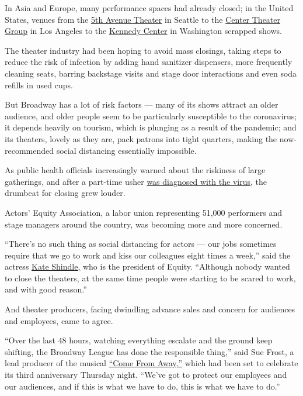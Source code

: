 In Asia and Europe, many performance spaces had already closed; in the
United States, venues from the \href{https://www.5thavenue.org/}{5th
Avenue Theater} in Seattle to the
\href{https://www.centertheatregroup.org/}{Center Theater Group} in Los
Angeles to the \href{https://www.kennedy-center.org/}{Kennedy Center} in
Washington scrapped shows.

The theater industry had been hoping to avoid mass closings, taking
steps to reduce the risk of infection by adding hand sanitizer
dispensers, more frequently cleaning seats, barring backstage visits and
stage door interactions and even soda refills in used cups.

But Broadway has a lot of risk factors --- many of its shows attract an
older audience, and older people seem to be particularly susceptible to
the coronavirus; it depends heavily on tourism, which is plunging as a
result of the pandemic; and its theaters, lovely as they are, pack
patrons into tight quarters, making the now-recommended social
distancing essentially impossible.

As public health officials increasingly warned about the riskiness of
large gatherings, and after a part-time usher
\href{https://www.nytimes3xbfgragh.onion/2020/03/11/theater/broadway-show-usher-coronavirus.html}{was
diagnosed with the virus}, the drumbeat for closing grew louder.

Actors' Equity Association, a labor union representing 51,000 performers
and stage managers around the country, was becoming more and more
concerned.

``There's no such thing as social distancing for actors --- our jobs
sometimes require that we go to work and kiss our colleagues eight times
a week,'' said the actress
\href{https://www.nytimes3xbfgragh.onion/2016/10/05/theater/union-boss-and-former-miss-america-hits-the-road-in-fun-home.html}{Kate
Shindle,} who is the president of Equity. ``Although nobody wanted to
close the theaters, at the same time people were starting to be scared
to work, and with good reason.''

And theater producers, facing dwindling advance sales and concern for
audiences and employees, came to agree.

``Over the last 48 hours, watching everything escalate and the ground
keep shifting, the Broadway League has done the responsible thing,''
said Sue Frost, a lead producer of the musical
\href{https://www.nytimes3xbfgragh.onion/2017/03/12/theater/come-from-away-review.html}{``Come
From Away,''} which had been set to celebrate its third anniversary
Thursday night. ``We've got to protect our employees and our audiences,
and if this is what we have to do, this is what we have to do.''

